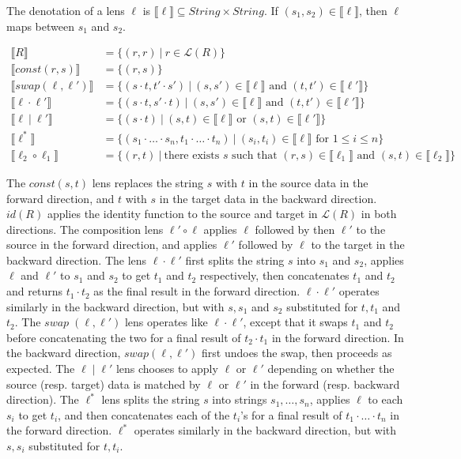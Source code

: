 \documentclass{svproc}
\newcommand{\sep}{\ensuremath{\ | \ }}
\begin{document}
The denotation of a lens $\ell$ is $\llbracket \ell \rrbracket \subseteq
\mathit{String} \times \mathit{String}$. If $(s_1, s_2) \in \llbracket \ell
\rrbracket$, then $\ell$ maps between $s_1$ and $s_2$.

\begin{align*}
\llbracket R \rrbracket &= \{(r, r) \sep r \in \mathcal{L}(R)\}\\
\llbracket const(r, s) \rrbracket &= \{(r, s)\}\\
\llbracket swap(\ell, \ell') \rrbracket &= \{(s \cdot t, t' \cdot s') \sep
(s, s') \in \llbracket \ell \rrbracket \text{ and } (t, t') \in \llbracket
\ell' \rrbracket\}\\
\llbracket \ell \cdot \ell' \rrbracket &= \{(s \cdot t, s' \cdot t) \sep
(s, s') \in \llbracket \ell \rrbracket \text{ and } (t, t') \in \llbracket
\ell' \rrbracket\}\\
\llbracket \ell \sep \ell' \rrbracket &= \{(s \cdot t) \sep
(s, t) \in \llbracket \ell \rrbracket \text{ or } (s, t) \in \llbracket
\ell' \rrbracket\}\\
\llbracket \ell^* \rrbracket &= \{(s_1 \cdot \ldots \cdot s_n, t_1 \cdot \ldots
\cdot t_n) \sep (s_i, t_i) \in \llbracket \ell \rrbracket \text{ for } 1
\leq i \leq n\}\\
\llbracket \ell_2 \circ \ell_1 \rrbracket &= \{(r, t) \sep \text{there exists }s
\text{ such that } (r, s) \in \llbracket \ell_1 \rrbracket \text{ and } (s, t)
\in \llbracket \ell_2 \rrbracket\}
\end{align*}

The $\mathit{const}(s, t)$ lens replaces the string $s$ with $t$ in the source
data in the forward direction, and $t$ with $s$ in the target data in the backward
direction. $\mathit{id}(R)$ applies the identity function to the source and target
in $\mathcal{L}(R)$ in both directions. The composition lens $\ell' \circ \ell$
applies $\ell$ followed by then $\ell'$ to the source in the forward direction,
and applies $\ell'$ followed by $\ell$ to the target in the backward direction.
The lens $\ell \cdot \ell'$ first splits the string $s$ into $s_1$ and $s_2$,
applies $\ell$ and $\ell'$ to $s_1$ and $s_2$ to get $t_1$ and $t_2$
respectively, then concatenates $t_1$ and $t_2$ and returns $t_1 \cdot t_2$ as
the final result in the forward direction. $\ell \cdot \ell'$ operates
similarly in the backward direction, but with $s, s_1$ and $s_2$ substituted
for $t, t_1$ and $t_2$. The $\mathit{swap} \; (\ell, \ell')$ lens operates
like $\ell \cdot \ell'$, except that it swaps $t_1$ and $t_2$ before
concatenating the two for a final result of $t_2 \cdot t_1$ in the forward
direction. In the backward direction, $\mathit{swap}(\ell, \ell')$ first undoes
the swap, then proceeds as expected. The $\ell \; | \; \ell'$ lens
chooses to apply $\ell$ or $\ell'$ depending on whether the source
(resp. target) data is matched by $\ell$ or $\ell'$ in the forward (resp.
backward direction). The $\ell^*$ lens splits the string $s$ into strings $s_1,
\ldots, s_n$, applies $\ell$ to each $s_i$ to get $t_i$, and then concatenates
each of the $t_i$'s for a final result of $t_1 \cdot \ldots \cdot t_n$ in the
forward direction. $\ell^*$ operates similarly in the backward direction, but
with $s, s_i$ substituted for $t, t_i$.
\end{document}
